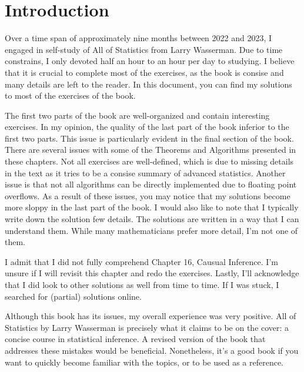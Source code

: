 \section*{Introduction}

Over a time span of approximately nine months between 2022 and 2023, I engaged in self-study of All of Statistics from Larry Wasserman.
Due to time constrains, I only devoted half an hour to an hour per day to studying.
I believe that it is crucial to complete most of the exercises, as the book is consise and many details are left to the reader.
In this document, you can find my solutions to most of the exercises of the book.

The first two parts of the book are well-organized and contain interesting exercises.
In my opinion, the quality of the last part of the book inferior to the first two parts.
This issue is particularly evident in the final section of the book.
There are several issues with some of the Theorems and Algorithms presented in these chapters.
Not all exercises are well-defined, which is due to missing details in the text as it tries to be a consise summary of advanced statistics.
Another issue is that not all algorithms can be directly implemented due to floating point overflows.
As a result of these issues, you may notice that my solutions become more sloppy in the last part of the book.
I would also like to note that I typically write down the solution few details.
The solutions are written in a way that I can understand them.
While many mathematicians prefer more detail, I'm not one of them.

I admit that I did not fully comprehend Chapter 16, Causual Inference.
I'm unsure if I will revisit this chapter and redo the exercises.
Lastly, I'll acknowledge that I did look to other solutions as well from time to time.
If I was stuck, I searched for (partial) solutions online.

Although this book has its issues, my overall experience was very positive.
All of Statistics by Larry Wasserman is precisely what it claims to be on the cover: a concise course in statistical inference.
A revised version of the book that addresses these mistakes would be beneficial.
Nonetheless, it's a good book if you want to quickly become familiar with the topics, or to be used as a reference.
